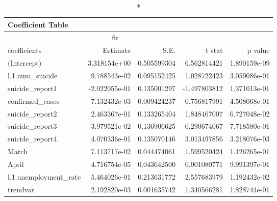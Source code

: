 \begin{longtable}{lrrrr}
\caption*{
{\large Coefficient Table}
} \\ 
\toprule
\multicolumn{4}{c}{fir} &  \\ 
\cmidrule(lr){1-4}
coefficients & Estimate & S.E. & t stat & p value \\ 
\midrule
(Intercept) & 3.318154e+00 & 0.505599304 & 6.562814421 & 1.890159e-09 \\ 
l.1.num\_suicide & 9.788543e-02 & 0.095152425 & 1.028722423 & 3.059086e-01 \\ 
suicide\_report1 & -2.022055e-01 & 0.135001297 & -1.497803812 & 1.371013e-01 \\ 
confirmed\_cases & 7.132432e-03 & 0.009424237 & 0.756817991 & 4.508068e-01 \\ 
suicide\_report2 & 2.463367e-01 & 0.133265404 & 1.848467007 & 6.727048e-02 \\ 
suicide\_report3 & 3.979521e-02 & 0.136906625 & 0.290674067 & 7.718580e-01 \\ 
suicide\_report4 & 4.070336e-01 & 0.135070146 & 3.013497856 & 3.218076e-03 \\ 
March & 7.113717e-02 & 0.044474061 & 1.599520424 & 1.126265e-01 \\ 
April & 4.716754e-05 & 0.043642500 & 0.001080771 & 9.991397e-01 \\ 
l.1.unemployment\_rate & 5.464026e-01 & 0.213631772 & 2.557683979 & 1.192432e-02 \\ 
trendvar & 2.192820e-03 & 0.001635742 & 1.340566281 & 1.828744e-01 \\ 
\bottomrule
\end{longtable}

